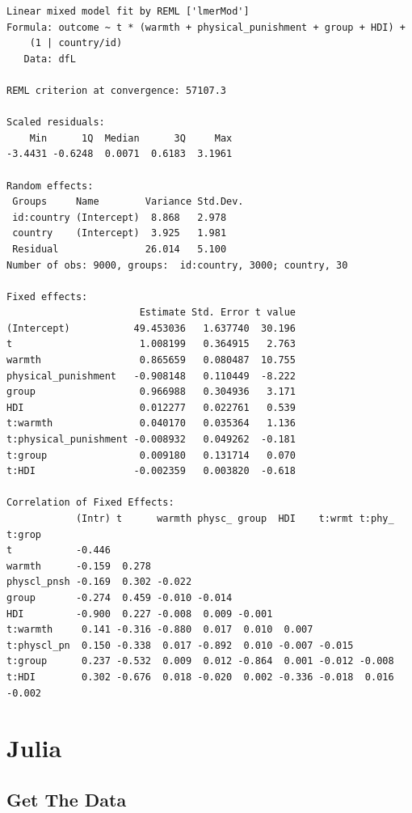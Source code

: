 \documentclass[
  letterpaper,
  DIV=11,
  numbers=noendperiod]{scrreprt}
\begin{document}
\begin{verbatim}
Linear mixed model fit by REML ['lmerMod']
Formula: outcome ~ t * (warmth + physical_punishment + group + HDI) +  
    (1 | country/id)
   Data: dfL

REML criterion at convergence: 57107.3

Scaled residuals: 
    Min      1Q  Median      3Q     Max 
-3.4431 -0.6248  0.0071  0.6183  3.1961 

Random effects:
 Groups     Name        Variance Std.Dev.
 id:country (Intercept)  8.868   2.978   
 country    (Intercept)  3.925   1.981   
 Residual               26.014   5.100   
Number of obs: 9000, groups:  id:country, 3000; country, 30

Fixed effects:
                       Estimate Std. Error t value
(Intercept)           49.453036   1.637740  30.196
t                      1.008199   0.364915   2.763
warmth                 0.865659   0.080487  10.755
physical_punishment   -0.908148   0.110449  -8.222
group                  0.966988   0.304936   3.171
HDI                    0.012277   0.022761   0.539
t:warmth               0.040170   0.035364   1.136
t:physical_punishment -0.008932   0.049262  -0.181
t:group                0.009180   0.131714   0.070
t:HDI                 -0.002359   0.003820  -0.618

Correlation of Fixed Effects:
            (Intr) t      warmth physc_ group  HDI    t:wrmt t:phy_ t:grop
t           -0.446                                                        
warmth      -0.159  0.278                                                 
physcl_pnsh -0.169  0.302 -0.022                                          
group       -0.274  0.459 -0.010 -0.014                                   
HDI         -0.900  0.227 -0.008  0.009 -0.001                            
t:warmth     0.141 -0.316 -0.880  0.017  0.010  0.007                     
t:physcl_pn  0.150 -0.338  0.017 -0.892  0.010 -0.007 -0.015              
t:group      0.237 -0.532  0.009  0.012 -0.864  0.001 -0.012 -0.008       
t:HDI        0.302 -0.676  0.018 -0.020  0.002 -0.336 -0.018  0.016 -0.002
\end{verbatim}

\section{Julia}

\subsection{Get The Data}\label{get-the-data-5}
\end{document}
